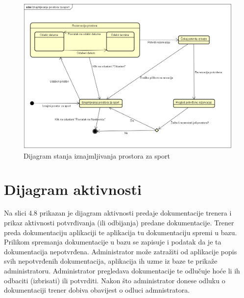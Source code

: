 			\begin{figure}[H]
				\includegraphics[width=\textwidth]{slike/dijagramStanja.png}
				\caption{Dijagram stanja iznajmljivanja prostora za sport}
			\end{figure}
			
			
			
			\eject 
		
		\section{Dijagram aktivnosti}
			Na slici 4.8 prikazan je dijagram aktivnosti predaje dokumentacije trenera i prikaz aktivnosti potvrđivanja (ili odbijanja) predane dokumentacije. Trener preda dokumentaciju aplikaciji te aplikacija tu dokumentaciju spremi u bazu. Prilikom spremanja dokumentacije u bazu se zapisuje i podatak da je ta dokumentacija nepotvrđena. Administrator može zatražiti od aplikacije popis svih nepotvrđenih dokumentacija, aplikacija ih uzme iz baze te prikaže administratoru. Administrator pregledava dokumentacije te odlučuje hoće li ih odbaciti (izbrisati) ili potvrditi. Nakon što administrator donese odluku o dokumentaciji trener dobiva obavijest o odluci admnistratora.
			
